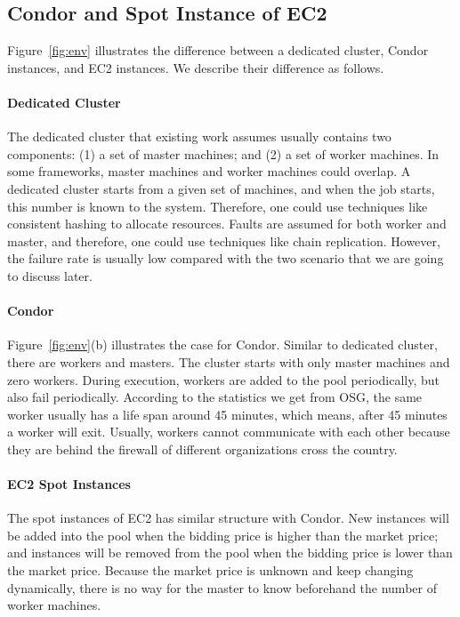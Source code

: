 \documentclass[11pt]{article}
\begin{document}
\subsection{Condor and Spot Instance of EC2}

Figure~\ref{fig:env} illustrates the difference between
a dedicated cluster, Condor instances, and EC2 instances.
We describe their difference as follows.

\paragraph*{Dedicated Cluster} The dedicated cluster
that existing work assumes usually contains two components:
(1) a set of master machines; and (2) a set of worker machines.
In some frameworks, master machines and worker machines
could overlap. A dedicated cluster starts from a given
set of machines, and when the job starts, this number is
known to the system. Therefore, one could use techniques
like consistent hashing to allocate resources. Faults
are assumed for both worker and master, and therefore,
one could use techniques like chain replication. However,
the failure rate is usually low compared with the two scenario
that we are going to discuss later.

\paragraph*{Condor} Figure~\ref{fig:env}(b) illustrates
the case for Condor. Similar to dedicated cluster, there
are workers and masters. The cluster starts with only
master machines and zero workers. During execution,
workers are added to the pool periodically, but also
fail periodically. According to the statistics we get
from OSG, the same worker usually has a life span around
45 minutes, which means, after 45 minutes a worker will
exit. Usually, workers cannot communicate with each other
because they are behind the firewall of different organizations
cross the country.

\paragraph*{EC2 Spot Instances} The spot instances
of EC2 has similar structure with Condor. New instances
will be added into the pool when the bidding price is
higher than the market price; and instances will be removed
from the pool when the bidding price is lower than
the market price. Because the market price is unknown and
keep changing dynamically, there is no way for the master
to know beforehand the number of worker machines.
\end{document}
